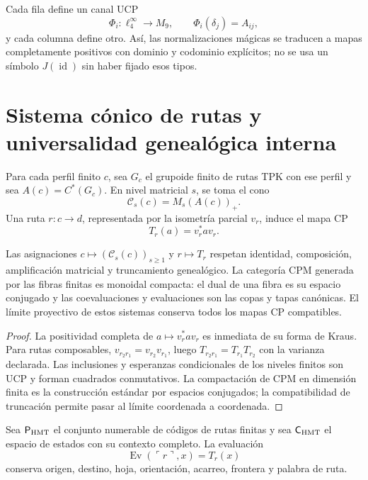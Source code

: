 Cada fila define un canal UCP
\[
 \Phi_i:\ell^\infty_4\to M_9,
 \qquad \Phi_i(\delta_j)=A_{ij},
\]
y cada columna define otro. Así, las normalizaciones mágicas se traducen a
mapas completamente positivos con dominio y codominio explícitos; no se usa
un símbolo \(J(\operatorname{id})\) sin haber fijado esos tipos.

\section{Sistema cónico de rutas y universalidad genealógica interna}
\label{sec:cpe-s-system-universalidad}

Para cada perfil finito \(c\), sea \(G_c\) el grupoide finito de rutas TPK
con ese perfil y sea \(A(c)=C^*(G_c)\). En nivel matricial \(s\), se toma el
cono
\[
 \mathcal C_s(c)=M_s(A(c))_+.
\]
Una ruta \(r:c\to d\), representada por la isometría parcial \(v_r\),
induce el mapa CP
\[
 T_r(a)=v_r^*av_r.
\]

\begin{theorem}
\label{thm:cpe-s-system-tpk}
Las asignaciones \(c\mapsto(\mathcal C_s(c))_{s\ge1}\) y
\(r\mapsto T_r\) respetan identidad, composición, amplificación matricial y
truncamiento genealógico. La categoría CPM generada por las fibras finitas
es monoidal compacta: el dual de una fibra es su espacio conjugado y las
coevaluaciones y evaluaciones son las copas y tapas canónicas. El límite
proyectivo de estos sistemas conserva todos los mapas CP compatibles.
\end{theorem}

\begin{proof}
La positividad completa de \(a\mapsto v_r^*av_r\) es inmediata de su forma
de Kraus. Para rutas composables,
\(v_{r_2r_1}=v_{r_2}v_{r_1}\), luego
\(T_{r_2r_1}=T_{r_1}T_{r_2}\) con la varianza declarada. Las inclusiones y
esperanzas condicionales de los niveles finitos son UCP y forman cuadrados
conmutativos. La compactación de CPM en dimensión finita es la construcción
estándar por espacios conjugados; la compatibilidad de truncación permite
pasar al límite coordenada a coordenada.
\end{proof}

Sea \(\mathsf P_{\rm HMT}\) el conjunto numerable de códigos de rutas
finitas y sea \(\mathsf C_{\rm HMT}\) el espacio de estados con su contexto
completo. La evaluación
\[
 \operatorname{Ev}(\ulcorner r\urcorner,x)=T_r(x)
\]
conserva origen, destino, hoja, orientación, acarreo, frontera y palabra de
ruta.

